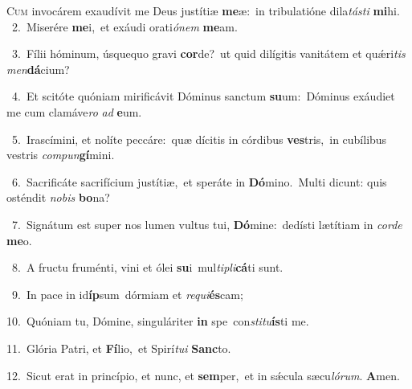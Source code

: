 \lettrine{\initial\textcolor{\initialcolor}{C}}{um} invocárem exaudívit me Deus justítiæ \textbf{me}\-æ:~\star in tribulatióne dila\-\textit{tás}\-\textit{ti} \textbf{mi}\-hi.\\
{\numbfont\textcolor{\numbcolor}{~2.}}~Miserére \textbf{me}\-i,~\star et exáudi orati\-\textit{ó}\-\textit{nem} \textbf{me}\-am.\par
{\numbfont\textcolor{\numbcolor}{~3.}}~Fílii hóminum, úsquequo gravi \textbf{cor}\-de?~\star ut quid dilígitis vanitátem et quǽri\textit{tis} \textit{men}\-\textbf{dá}cium?\par
{\numbfont\textcolor{\numbcolor}{~4.}}~Et scitóte quóniam mirificávit Dóminus sanctum \textbf{su}\-um:~\star Dóminus exáudiet me cum clamáve\textit{ro} \textit{ad} \textbf{e}\-um.\par
{\numbfont\textcolor{\numbcolor}{~5.}}~Irascímini, et nolíte peccáre:~\dagger quæ dícitis in córdibus \textbf{ves}\-tris,~\star in cubílibus vestris \textit{com}\-\textit{pun}\textbf{gí}mini.\par
{\numbfont\textcolor{\numbcolor}{~6.}}~Sacrificáte sacrifícium justítiæ,~\dagger et speráte in \textbf{Dó}\-mino.~\star Multi dicunt: quis osténdit \textit{no}\-\textit{bis} \textbf{bo}\-na?\par
{\numbfont\textcolor{\numbcolor}{~7.}}~Signátum est super nos lumen vultus tui, \textbf{Dó}\-mine:~\star dedísti lætítiam in \textit{cor}\-\textit{de} \textbf{me}\-o.\par
{\numbfont\textcolor{\numbcolor}{~8.}}~A fructu fruménti, vini et ólei \textbf{su}\-i~\star mul\-\textit{ti}\-\textit{pli}\textbf{cá}ti sunt.\par
{\numbfont\textcolor{\numbcolor}{~9.}}~In pace in id\-\textbf{íp}\-sum~\star dórmiam et \textit{re}\-\textit{qui}\textbf{és}cam;\par
{\numbfont\textcolor{\numbcolor}{10.}}~Quóniam tu, Dómine, singuláriter \textbf{in} spe~\star con\-\textit{sti}\-\textit{tu}\textbf{ís}ti me.\par
{\numbfont\textcolor{\numbcolor}{11.}}~Glória Patri, et \textbf{Fí}\-lio,~\star et Spirí\-\textit{tu}\-\textit{i} \textbf{Sanc}\-to.\par
{\numbfont\textcolor{\numbcolor}{12.}}~Sicut erat in princípio, et nunc, et \textbf{sem}\-per,~\star et in sǽcula sæcu\-\textit{ló}\-\textit{rum}. \textbf{A}\-men.\par
